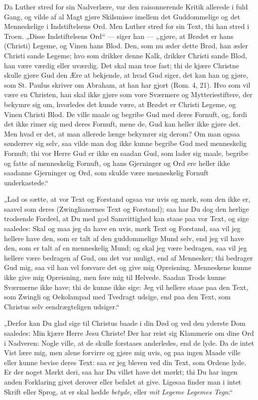 \documentclass[12pt,a4paper]{book}
\newcommand{\opage}[1]{\marginnote{\footnotesize\textit{[#1]}}}
\begin{document}
Da Luther stred for sin Nadverlære, var den raisonnerende Kritik
allerede i fuld Gang, og vilde af al Magt gjøre Skilsmisse imellem
det Guddommelige og det Menneskelige i Indstiftelsens Ord. Men Luther
stred for sin Text, thi han stred i Troen. „Disse Indstiftelsens
Ord“ --- siger han --- „gjøre, at Brødet er hans (Christi) Legeme,
og Vinen hans Blod. Den, som nu æder dette Brød, han æder Christi
sande Legeme; hvo som drikker denne Kalk, drikker Christi sande Blod,
han være
\opage{30} værdig eller uværdig. Det skal man troe fast; thi de kjære Christne
skulle gjøre Gud den Ære at bekjende, at hvad Gud siger, det kan han
og gjøre, som St. Paulus skriver om Abraham, at han har gjort (Rom.
4, 21). Hvo som vil være en Christen, han skal ikke gjøre som vore
Sværmere og Mytteriestiftere, der bekymre sig om, hvorledes det kunde
være, at Brødet er Christi Legeme, og Vinen Christi Blod. De ville
maale og begribe Gud med deres Fornuft, og, fordi det ikke rimer sig
med deres Fornuft, mene de, Gud kan heller ikke gjøre det. Men hvad
er det, at man allerede længe bekymrer sig derom? Om man ogsaa
sønderrev sig selv, saa vilde man dog ikke kunne begribe Gud med
menneskelig Fornuft; thi vor Herre Gud er ikke en saadan Gud, som
lader sig maale, begribe og fatte af menneskelig Fornuft, og hans
Gjerninger og Ord ere heller ikke saadanne Gjerninger og Ord, som
skulde være menneskelig Fornuft underkastede.“

„Lad os sætte, at vor Text og Forstand ogsaa var uvis og mørk, som
den ikke er, saavel som deres (Zwinglianernes Text og Forstand); saa
har Du dog den herlige trodsende Fordeel, at Du med god Samvittighed
kan staae paa vor Text, og sige saaledes: Skal og maa jeg da have en
uvis, mørk Text og Forstand, saa vil jeg hellere have den, som er
talt af den guddommelige Mund selv, end jeg vil have den, som er talt
af en menneskelig Mund; og skal jeg være bedragen, saa vil jeg
hellere være bedragen af Gud, om det var muligt, end af Mennesker;
thi bedrager Gud mig, saa vil han vel forsvare det og give mig
Opreisning. Menneskene kunne ikke give mig Opreisning, men føre mig
til Helvede. Saadan Trods kunne Sværmerne ikke have; thi de kunne
ikke sige: Jeg vil hellere staae paa den Text, som Zwingli og
Oekolampad med Tvedragt udsige, end paa den Text, som Christus selv
eendrægteligen udsiger.“

„Derfor kan Du glad sige til Christus baade i din Død og ved den
yderste Dom saaledes: Min kjære Herre Jesu Christe!
\opage{31} Der har reist sig Klammerie om dine Ord i Nadveren: Nogle ville, at
de skulle forstaaes anderledes, end de lyde. Da de intet Vist lære
mig, men alene forvirre og gjøre mig uvis, og paa ingen Maade ville
eller kunne bevise deres Text: saa er jeg bleven ved din Text, som
Ordene lyde. Er der noget Mørkt deri, saa har Du villet have det
mørkt; thi Du har ingen anden Forklaring givet derover eller befalet
at give. Ligesaa finder man i intet Skrift eller Sprog, at er skal
hedde \emph{betyde}, eller \emph{mit Legeme Legemes Tegn}.“
\end{document}
